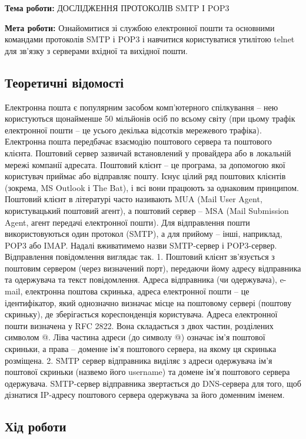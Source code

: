 \documentclass[12pt]{extarticle}
\begin{document}
\textbf{Тема роботи:} ДОСЛІДЖЕННЯ ПРОТОКОЛІВ
SMTP І POP3
\vspace{12pt}

\textbf{Мета роботи:} Ознайомитися зі службою електронної пошти та основними
командами протоколів SMTP і POP3 і навчитися користуватися утилітою telnet
для зв’язку з серверами вхідної та вихідної пошти.
\subsection*{Теоретичні відомості}
Електронна пошта є популярним засобом комп’ютерного спілкування –
нею користуються щонайменше 50 мільйонів осіб по всьому світу (при цьому
трафік електронної пошти – це усього декілька відсотків мережевого трафіка).
Електронна пошта передбачає взаємодію поштового сервера та поштового
клієнта.
Поштовий сервер зазвичай встановлений у провайдера або в локальній
мережі компанії адресата.
Поштовий клієнт – це програма, за допомогою якої користувач приймає
або відправляє пошту. Існує цілий ряд поштових клієнтів (зокрема, MS Outlook
і The Bat), і всі вони працюють за однаковим принципом.
Поштовий клієнт в літературі часто називають MUA (Mail User Agent,
користувацький поштовий агент), а поштовий сервер – MSA (Mail Submission
Agent, агент передачі електронної пошти).
Для відправлення пошти використовуються один протокол (SMTP), а для
прийому – інші, наприклад, POP3 або IMAP. Надалі вживатимемо назви
SMTP-сервер і POP3-сервер.
Відправлення повідомлення виглядає так.
1. Поштовий клієнт зв’язується з поштовим сервером (через визначений
порт), передаючи йому адресу відправника та одержувача та текст
повідомлення.
Адреса відправника (чи одержувача), e-mail, електронна поштова
скринька, адреса електронної пошти – це ідентифікатор, який однозначно
визначає місце на поштовому сервері (поштову скриньку), де зберігається
кореспонденція користувача.
Адреса електронної пошти визначена у RFC 2822. Вона складається з двох
частин, розділених символом @. Ліва частина адреси (до символу @) означає
ім’я поштової скриньки, а права – доменне ім’я поштового сервера, на якому
ця скринька розміщена.
2. SMTP сервер відправника виділяє з адреси одержувача ім’я поштової
скриньки (назвемо його username) та домене ім’я поштового сервера
одержувача.
SMTP-сервер відправника звертається до DNS-сервера для того, щоб
дізнатися IP-адресу поштового сервера одержувача за його доменним іменем.
\break
\subsection*{Хід роботи}
\end{document}

